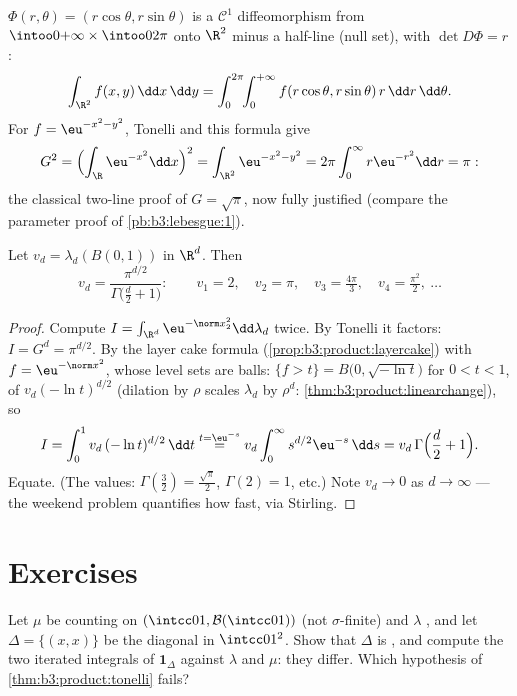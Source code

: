 \begin{example}
\label{ex:b3:product:polar}
$\Phi(r, \theta) = (r\cos\theta, r\sin\theta)$ is a $\mathcal
C^1$ diffeomorphism from $\intoo0{+\infty}\times\intoo0{2\pi}$
onto $\R^2$ minus a half-line (null set), with $\det D\Phi =
r$:
\[
\int_{\R^2}f(x, y)\,\dd x\,\dd y
= \int_0^{2\pi}\!\!\int_0^{+\infty}
f(r\cos\theta, r\sin\theta)\,r\,\dd r\,\dd\theta .
\]
For $f = \eu^{-x^2-y^2}$, Tonelli and this formula give
\[
G^2 = \Bigl(\int_\R \eu^{-x^2}\dd x\Bigr)^2
= \int_{\R^2}\eu^{-x^2-y^2}
= 2\pi\int_0^\infty r\eu^{-r^2}\dd r = \pi:
\]
the classical two-line proof of $G = \sqrt\pi$, now fully
justified (compare the parameter proof of
\cref{pb:b3:lebesgue:1}).
\end{example}

\begin{theorem}
\label{thm:b3:product:ballvolume}
Let $v_d = \lambda_d(B(0,1))$ in $\R^d$. Then
\[
v_d = \frac{\pi^{d/2}}{\Gamma\bigl(\frac d2 + 1\bigr)} :
\qquad
v_1 = 2,\quad v_2 = \pi,\quad v_3 = \tfrac{4\pi}3,\quad
v_4 = \tfrac{\pi^2}2,\ \dots
\]
\end{theorem}

\begin{proof}
Compute $I = \int_{\R^d}\eu^{-\norm x_2^2}\dd\lambda_d$ twice.
By Tonelli it factors: $I = G^d = \pi^{d/2}$. By the layer cake
formula (\cref{prop:b3:product:layercake}) with $f = \eu^{-
\norm x^2}$, whose level sets are balls: $\{f > t\} =
B\bigl(0, \sqrt{-\ln t}\bigr)$ for $0 < t < 1$, of 
$v_d(-\ln t)^{d/2}$ (dilation by $\rho$ scales $\lambda_d$ by
$\rho^d$: \cref{thm:b3:product:linearchange}), so
\[
I = \int_0^1 v_d\,(-\ln t)^{d/2}\,\dd t
\overset{t = \eu^{-s}}{=}
v_d\int_0^\infty s^{d/2}\eu^{-s}\,\dd s
= v_d\,\Gamma\Bigl(\frac d2 + 1\Bigr).
\]
Equate. (The values: $\Gamma(\frac32) = \frac{\sqrt\pi}2$,
$\Gamma(2) = 1$, etc.) Note $v_d \to 0$ as $d \to \infty$ ---
the weekend problem quantifies how fast, via Stirling.
\end{proof}

\section{Exercises}

\begin{exercise}[$\star$]\label{exo:b3:product:1}
Let $\mu$ be counting  on $(\intcc01, \mathcal
B(\intcc01))$ (not $\sigma$-finite) and $\lambda$ , and let $\Delta = \{(x,x)\}$ be the diagonal in
$\intcc01^2$. Show that $\Delta$ is , and compute the
two iterated integrals of $\mathbf 1_\Delta$ against
$\lambda$ and $\mu$: they differ. Which hypothesis of
\cref{thm:b3:product:tonelli} fails?
\end{exercise}

